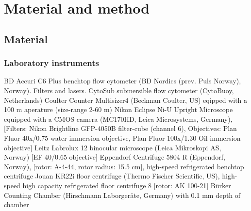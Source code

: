 \chapter{Material and method}
\label{chap:m&m}

\section{Material}

\subsection{Laboratory instruments}
BD Accuri C6 Plus benchtop flow cytometer (BD Nordics (prev. Puls Norway), Norway). Filters and lasers.
CytoSub submersible flow cytometer (CytoBuoy, Netherlands)
Coulter Counter Multisizer4 (Beckman Coulter, US) eqipped with a 100 \micro m aperature (size-range 2-60 \micro m)
Nikon Eclipse Ni-U Upright Microscope equipped with a CMOS camera (MC170HD, Leica Microsystems, Germany), [Filters: Nikon Brightline GFP-4050B filter-cube (channel 6), Objectives: Plan Fluor 40x/0.75 water immersion objective, Plan Fluor 100x/1.30 Oil immersion objective]
Leitz Labrolux 12 binocular microscope (Leica Mikroskopi AS, Norway) [EF 40/0.65 objective]
Eppendorf Centrifuge 5804 R (Eppendorf, Norway), [rotor: A-4-44, rotor radius: 15.5 cm], high-speed refrigerated benchtop centrifuge
Jouan KR22i floor centrifuge (Thermo Fischer Scientific, US), high-speed high capacity refrigerated floor centrifuge 8 [rotor: AK 100-21]
Bürker Counting Chamber (Hirschmann Laborgeräte, Germany) with 0.1 mm depth of chamber

